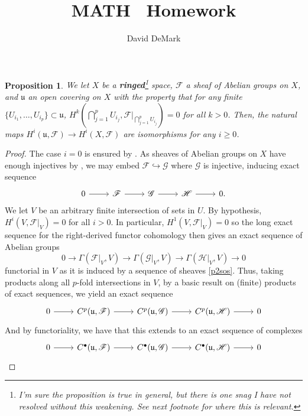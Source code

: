 \documentclass[english,letter,doublesided]{article}
\title{MATH \course~Homework \Roman{hwn}}
\author{David DeMark}
\date{\due}
\newcommand{\evat}[3]{\left. #1\right|_{#2}^{#3}}
\newcommand{\Ff}{\mathscr{F}}
\newcommand{\Hh}{\mathscr{H}}
\newcommand{\Gg}{\mathscr{G}}
\newcommand{\ufr}{\mathfrak{u}}
\newcommand{\prob}[1]{\setcounter{section}{#1-1}\section{}}
\newtheorem*{prop*}{Proposition}
\theoremstyle{remark}
\theoremstyle{definition}
\newcommand{\restr}[2]{{\evat{#1}{#2}{}}}
\begin{document}
\maketitle
\prob{2}\begin{prop*} We let $X$ be a \textbf{ringed}\footnote{I'm sure the proposition is true in general, but there is one snag I have not resolved without this weakening. See next footnote for where this is relevant.} space, ${\Ff}$ a sheaf of Abelian groups on $X$, and $\ufr$ an open covering on $X$ with the property that for any finite $\{U_{i_1},\dots,U_{i_p}\}\subset \ufr$, $H^k\left(\bigcap_{j=1}^pU_{i_j},\restr{\Ff}{\bigcap_{j=1}^pU_{i_j}}\right)=0$ for all $k>0$. Then, the natural maps $H^i(\ufr,\Ff)\to H^i(X,\Ff)$ are isomorphisms for any $i\geq 0$. 
	\end{prop*}
\begin{proof}
	The case $i=0$ is ensured by \cite[III.4.1]{HSAG}. As sheaves of Abelian groups on $X$ have enough injectives by \cite[III.2.3]{HSAG}, we may embed $\Ff\hookrightarrow\Gg$ where $\Gg$ is injective, inducing exact sequence \begin{equation}\label{p2sos}\begin{tikzcd}
	0\arrow[r]&\Ff\arrow[r]&\Gg\arrow[r]&\Hh\arrow[r]&0.
	\end{tikzcd}\end{equation}
	We let $V$ be an arbitrary finite intersection of sets in $U$. By hypothesis, $H^i(V,\restr{\Ff}{V})=0$ for all $i>0$. In particular, $H^1(V,\restr{\Ff}{V})=0$ so the long exact sequence for the right-derived functor cohomology then gives an exact sequence of Abelian groups
	$$0\to\Gamma(\restr{\Ff}{V},V)\to \Gamma(\restr{\Gg}{V},V)\to \Gamma(\restr{\Hh}{V},V)\to 0$$
	functorial in $V$ as it is induced by a sequence of sheaves \eqref{p2sos}. Thus, taking products along all $p$-fold intersections in $V$, by a basic result on (finite) products of exact sequences, we yield an exact sequence 
	\begin{equation*}
		\begin{tikzcd}
		0\arrow[r]& C^p(\ufr,\Ff)\arrow[r]& C^p(\ufr,\Gg)\arrow[r]&C^p(\ufr,\Hh)\arrow[r]&0
		\end{tikzcd}
	\end{equation*}
	And by functoriality, we have that this extends to an exact sequence of complexes
		\begin{equation}
	\begin{tikzcd}\label{p2soc}
	0\arrow[r]& C^\bullet(\ufr,\Ff)\arrow[r]& C^\bullet(\ufr,\Gg)\arrow[r]&C^\bullet(\ufr,\Hh)\arrow[r]&0

\end{tikzcd}
\end{equation}
\end{proof}
\end{document}
